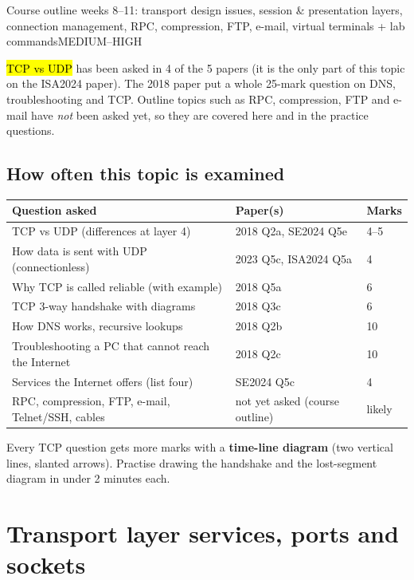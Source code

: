 \documentclass[10pt]{article}
\begin{document}
  {Course outline weeks 8--11: transport design issues, session \& presentation layers, connection management, RPC, compression, FTP, e-mail, virtual terminals + lab commands}{MEDIUM--HIGH}

\hl{TCP vs UDP} has been asked in 4 of the 5 papers (it is the only part of this topic on the ISA2024 paper).
The 2018 paper put a whole 25-mark question on DNS, troubleshooting and TCP. Outline topics such as RPC, compression, FTP and e-mail have \emph{not} been asked yet, so they are covered here and in the practice questions.

\subsection*{How often this topic is examined}
\begin{tabularx}{\linewidth}{@{}Xll@{}}
\toprule
\textbf{Question asked} & \textbf{Paper(s)} & \textbf{Marks}\\
\midrule
TCP vs UDP (differences at layer 4) & 2018 Q2a, SE2024 Q5e & 4--5\\
How data is sent with UDP (connectionless) & 2023 Q5c, ISA2024 Q5a & 4\\
Why TCP is called reliable (with example) & 2018 Q5a & 6\\
TCP 3-way handshake with diagrams & 2018 Q3c & 6\\
How DNS works, recursive lookups & 2018 Q2b & 10\\
Troubleshooting a PC that cannot reach the Internet & 2018 Q2c & 10\\
Services the Internet offers (list four) & SE2024 Q5c & 4\\
RPC, compression, FTP, e-mail, Telnet/SSH, cables & not yet asked (course outline) & likely\\
\bottomrule
\end{tabularx}

\begin{examtip}
Every TCP question gets more marks with a \textbf{time-line diagram} (two vertical lines, slanted arrows).
Practise drawing the handshake and the lost-segment diagram in under 2 minutes each.
\end{examtip}

\section{Transport layer services, ports and sockets}
\end{document}
